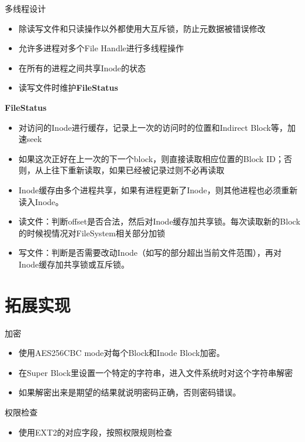 \documentclass{beamer}
\begin{document}
\begin{frame}{多线程设计}
\begin{itemize}[<+-| alert@+>]
    \item 除读写文件和只读操作以外都使用大互斥锁，防止元数据被错误修改
    \item 允许多进程对多个File Handle进行多线程操作
    \item 在所有的进程之间共享Inode的状态
    \item 读写文件时维护\textbf{FileStatus}
\end{itemize}
\end{frame}

\begin{frame}{\textbf{FileStatus}}
\begin{itemize}[<+-| alert@+>]
    \item 对访问的Inode进行缓存，记录上一次的访问时的位置和Indirect Block等，加速seek
    \item 如果这次正好在上一次的下一个block，则直接读取相应位置的Block ID；否则，从上往下重新读取，如果已经被记录过则不必再读取
    \item Inode缓存由多个进程共享，如果有进程更新了Inode，则其他进程也必须重新读入Inode。
    \item 读文件：判断offset是否合法，然后对Inode缓存加共享锁。每次读取新的Block的时候视情况对FileSystem相关部分加锁
    \item 写文件：判断是否需要改动Inode（如写的部分超出当前文件范围），再对Inode缓存加共享锁或互斥锁。
\end{itemize}
\end{frame}


\section{拓展实现}

\begin{frame}{加密}
\begin{itemize}[<+-| alert@+>]
    \item 使用AES256CBC mode对每个Block和Inode Block加密。
    \item 在Super Block里设置一个特定的字符串，进入文件系统时对这个字符串解密
    \item 如果解密出来是期望的结果就说明密码正确，否则密码错误。
\end{itemize}
\end{frame}

\begin{frame}{权限检查}
\begin{itemize}[<+-| alert@+>]
    \item 使用EXT2的对应字段，按照权限规则检查
\end{itemize}
\end{frame}
\end{document}
